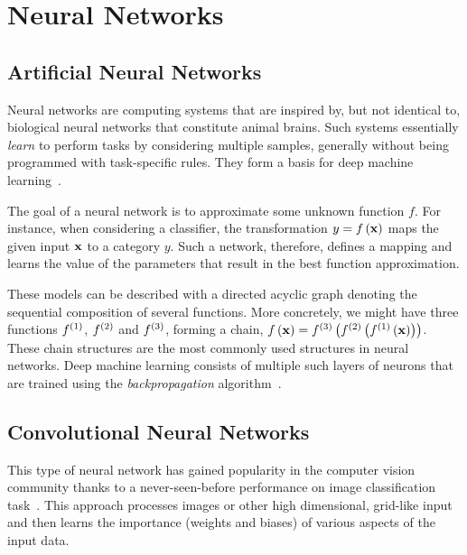\section{Neural Networks}

\subsection{Artificial Neural Networks}
\label{ssec:ArtificialNeuralNetworks}

Neural networks are computing systems that are inspired by, but not identical to, biological neural networks that constitute animal brains. Such systems essentially \emph{learn} to perform tasks by considering multiple samples, generally without being programmed with task-specific rules. They form a basis for deep machine learning~\cite{goodfellow2016dl}.

The goal of a neural network is to approximate some unknown function $f$. For instance, when considering a classiﬁer, the transformation $y = {f} \left( {\mathbf{x}} \right)$  maps the given input ${\mathbf{x}}$ to a category $y$. Such a network, therefore, defines a mapping and learns the value of the parameters that result in the best function approximation.

These models can be described with a directed acyclic graph denoting the sequential composition of several functions. More concretely, we might have three functions ${f}^{\left( {1} \right)}$, ${f}^{\left( {2} \right)}$ and ${f}^{\left( {3} \right)}$, forming a chain, ${f} \left( {\mathbf{x}} \right) = {{f}^{\left( {3} \right)}} \left( {{f}^{\left( {2} \right)}} \left( {{f}^{\left( {1} \right)}} \left( {\mathbf{x}} \right) \right) \right)$. These chain structures are the most commonly used structures in neural networks. Deep machine learning consists of multiple such layers of neurons that are trained using the \emph{backpropagation} algorithm~\cite{rumelhart1986backprop}.

\subsection{Convolutional Neural Networks}
\label{ssec:ConvolutionalNeuralNetworks}

This type of neural network has gained popularity in the computer vision community thanks to a never-seen-before performance on image classification task~\cite{krizhevsky2012classification}. This approach processes images or other high dimensional, grid-like input and then learns the importance (weights and biases) of various aspects of the input data.

